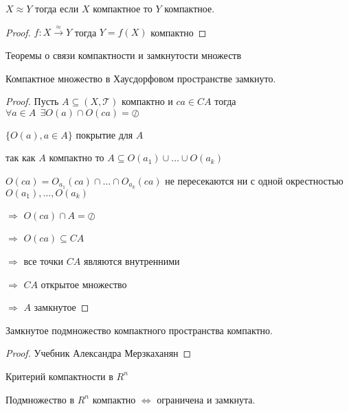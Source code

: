 \begin{block}[Следствие]
  $X \approx Y$ тогда если $X$ компактное то $Y$ компактное.
\end{block}

\begin{proof}
  $f:X \stackrel{\approx}{\to} Y$ тогда $Y = f(X)$ компактно
\end{proof}

\begin{title}[\Large]
  Теоремы о связи компактности и замкнутости множеств
\end{title}

\begin{theorem}
  Компактное множество в Хаусдорфовом пространстве замкнуто.
\end{theorem}

\begin{proof}
  Пусть $A \subseteq (X, \mathcal{T})$ компактно и $ca \in CA$ тогда
  $\forall a \in A ~~ \exists O(a) \cap O(ca) = \oslash$

  $\{O(a), a \in A\}$ покрытие для $A$

  так как $A$ компактно то $A \subseteq O(a_1) \cup \ldots \cup O(a_k)$

  $O(ca) = O_{a_1}(ca) \cap \ldots \cap O_{a_k}(ca)$ не пересекаются ни с одной
  окрестностью $O(a_1), \ldots, O(a_k)$

  $\Rightarrow$ $O(ca) \cap A = \oslash$

  $\Rightarrow$ $O(ca) \subseteq CA$

  $\Rightarrow$ все точки $CA$ являются внутренними

  $\Rightarrow$ $CA$ открытое множество

  $\Rightarrow$ $A$ замкнутое
\end{proof}

\begin{theorem}
  Замкнутое подмножество компактного пространства компактно.
\end{theorem}

\begin{proof}
  Учебник Александра Мерзкаханян
\end{proof}

\begin{title}[\Large]
  Критерий компактности в $R^n$
\end{title}

\begin{theorem}
  Подмножество в $R^n$ компактно $\Leftrightarrow$ ограничена и
  замкнута.
\end{theorem}

